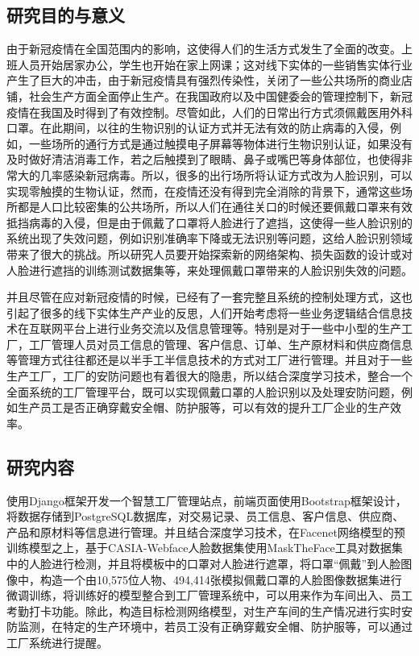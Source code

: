\subsection{研究目的与意义}

由于新冠疫情在全国范围内的影响，这使得人们的生活方式发生了全面的改变。上班人员开始居家办公，学生也开始在家上网课；这对线下实体的一些销售实体行业产生了巨大的冲击，由于新冠疫情具有强烈传染性，关闭了一些公共场所的商业店铺，社会生产方面全面停止生产。在我国政府以及中国健委会的管理控制下，新冠疫情在我国及时得到了有效控制。尽管如此，人们的日常出行方式须佩戴医用外科口罩。在此期间，以往的生物识别的认证方式并无法有效的防止病毒的入侵，例如，一些场所的通行方式是通过触摸电子屏幕等物体进行生物识别认证，如果没有及时做好清洁消毒工作，若之后触摸到了眼睛、鼻子或嘴巴等身体部位，也使得非常大的几率感染新冠病毒。所以，很多的出行场所将认证方式改为人脸识别，可以实现零触摸的生物认证，然而，在疫情还没有得到完全消除的背景下，通常这些场所都是人口比较密集的公共场所，所以人们在通往关口的时候还要佩戴口罩来有效抵挡病毒的入侵，但是由于佩戴了口罩将人脸进行了遮挡，这使得一些人脸识别的系统出现了失效问题，例如识别准确率下降或无法识别等问题，这给人脸识别领域带来了很大的挑战。所以研究人员要开始探索新的网络架构、损失函数的设计或对人脸进行遮挡的训练测试数据集等，来处理佩戴口罩带来的人脸识别失效的问题。

并且尽管在应对新冠疫情的时候，已经有了一套完整且系统的控制处理方式，这也引起了很多的线下实体生产产业的反思，人们开始考虑将一些业务逻辑结合信息技术在互联网平台上进行业务交流以及信息管理等。特别是对于一些中小型的生产工厂，工厂管理人员对员工信息的管理、客户信息、订单、生产原材料和供应商信息等管理方式往往都还是以半手工半信息技术的方式对工厂进行管理。并且对于一些生产工厂，工厂的安防问题也有着很大的隐患，所以结合深度学习技术，整合一个全面系统的工厂管理平台，既可以实现佩戴口罩的人脸识别以及处理安防问题，例如生产员工是否正确穿戴安全帽、防护服等，可以有效的提升工厂企业的生产效率。

\subsection{研究内容}

使用Django框架开发一个智慧工厂管理站点，前端页面使用Bootstrap框架设计，将数据存储到PostgreSQL数据库，对交易记录、员工信息、客户信息、供应商、产品和原材料等信息进行管理。并且结合深度学习技术，在Facenet网络模型的预训练模型之上，基于CASIA-Webface人脸数据集使用MaskTheFace工具对数据集中的人脸进行检测，并且将模板中的口罩对人脸进行遮罩，将口罩“佩戴”到人脸图像中，构造一个由10,575位人物、494,414张模拟佩戴口罩的人脸图像数据集进行微调训练，将训练好的模型整合到工厂管理系统中，可以用来作为车间出入、员工考勤打卡功能。除此，构造目标检测网络模型，对生产车间的生产情况进行实时安防监测，在特定的生产环境中，若员工没有正确穿戴安全帽、防护服等，可以通过工厂系统进行提醒。